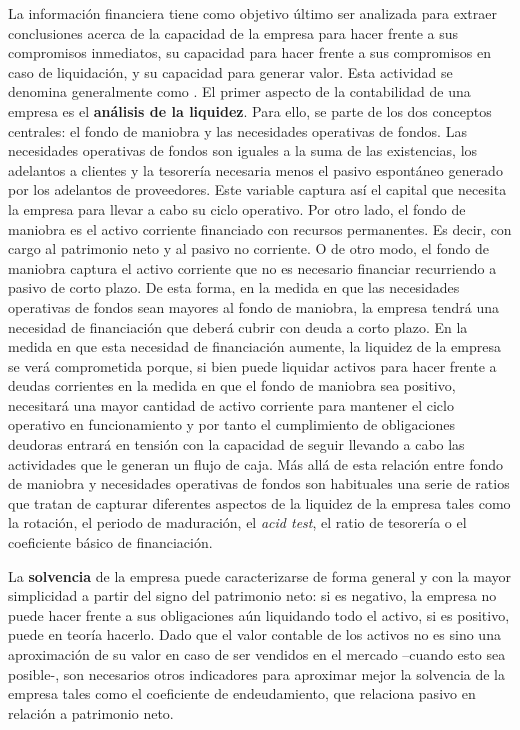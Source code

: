 \documentclass{nuevotema}
\begin{document}
La información financiera tiene como objetivo último ser analizada para extraer conclusiones acerca de la capacidad de la empresa para hacer frente a sus compromisos inmediatos, su capacidad para hacer frente a sus compromisos en caso de liquidación, y su capacidad para generar valor. Esta actividad se denomina generalmente como . El primer aspecto de la contabilidad de una empresa es el \textbf{análisis de la liquidez}. Para ello, se parte de los dos conceptos centrales: el fondo de maniobra y las necesidades operativas de fondos. Las necesidades operativas de fondos son iguales a la suma de las existencias, los adelantos a clientes y la tesorería necesaria menos el pasivo espontáneo generado por los adelantos de proveedores. Este variable captura así el capital que necesita la empresa para llevar a cabo su ciclo operativo. Por otro lado, el fondo de maniobra es el activo corriente financiado con recursos permanentes. Es decir, con cargo al patrimonio neto y al pasivo no corriente. O de otro modo, el fondo de maniobra captura el activo corriente que no es necesario financiar recurriendo a pasivo de corto plazo. De esta forma, en la medida en que las necesidades operativas de fondos sean mayores al fondo de maniobra, la empresa tendrá una necesidad de financiación que deberá cubrir con deuda a corto plazo. En la medida en que esta necesidad de financiación aumente, la liquidez de la empresa se verá comprometida porque, si bien puede liquidar activos para hacer frente a deudas corrientes en la medida en que el fondo de maniobra sea positivo, necesitará una mayor cantidad de activo corriente para mantener el ciclo operativo en funcionamiento y por tanto el cumplimiento de obligaciones deudoras entrará en tensión con la capacidad de seguir llevando a cabo las actividades que le generan un flujo de caja. Más allá de esta relación entre fondo de maniobra y necesidades operativas de fondos son habituales una serie de ratios que tratan de capturar diferentes aspectos de la liquidez de la empresa tales como la rotación, el periodo de maduración, el \textit{acid test}, el ratio de tesorería o el coeficiente básico de financiación. 

La \textbf{solvencia} de la empresa puede caracterizarse de forma general y con la mayor simplicidad a partir del signo del patrimonio neto: si es negativo, la empresa no puede hacer frente a sus obligaciones aún liquidando todo el activo, si es positivo, puede en teoría hacerlo. Dado que el valor contable de los activos no es sino una aproximación de su valor en caso de ser vendidos en el mercado --cuando esto sea posible-, son necesarios otros indicadores para aproximar mejor la solvencia de la empresa tales como el coeficiente de endeudamiento, que relaciona pasivo en relación a patrimonio neto.
\end{document}
